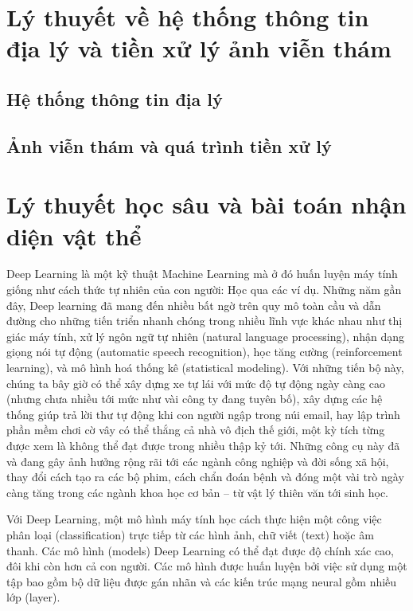 \documentclass[a4paper, 12pt]{report}
\begin{document}
\chapter{Lý thuyết về hệ thống thông tin địa lý và tiền xử lý ảnh viễn thám}

\section{Hệ thống thông tin địa lý}

\section{Ảnh viễn thám và quá trình tiền xử lý}




\chapter{Lý thuyết học sâu và bài toán nhận diện vật thể}
Deep Learning là một kỹ thuật Machine Learning mà ở đó huấn luyện máy tính giống như cách thức tự nhiên của con người: Học qua các ví dụ. Những năm gần đây, Deep learning đã mang đến nhiều bất ngờ trên quy mô toàn cầu và dẫn đường cho những tiến triển nhanh chóng trong nhiều lĩnh vực khác nhau như thị giác máy tính, xử lý ngôn ngữ tự nhiên (natural language processing), nhận dạng giọng nói tự động (automatic speech recognition), học tăng cường (reinforcement learning), và mô hình hoá thống kê (statistical modeling). Với những tiến bộ này, chúng ta bây giờ có thể xây dựng xe tự lái với mức độ tự động ngày càng cao (nhưng chưa nhiều tới mức như vài công ty đang tuyên bố), xây dựng các hệ thống giúp trả lời thư tự động khi con người ngập trong núi email, hay lập trình phần mềm chơi cờ vây có thể thắng cả nhà vô địch thế giới, một kỳ tích từng được xem là không thể đạt được trong nhiều thập kỷ tới. Những công cụ này đã và đang gây ảnh hưởng rộng rãi tới các ngành công nghiệp và đời sống xã hội, thay đổi cách tạo ra các bộ phim, cách chẩn đoán bệnh và đóng một vài trò ngày càng tăng trong các ngành khoa học cơ bản – từ vật lý thiên văn tới sinh học.\par
Với Deep Learning, một mô hình máy tính học cách thực hiện một công việc phân loại (classification) trực tiếp từ các hình ảnh, chữ viết (text) hoặc âm thanh. Các mô hình (models) Deep Learning có thể đạt được độ chính xác cao, đôi khi còn hơn cả con người. Các mô hình được huấn luyện bởi việc sử dụng một tập bao gồm bộ dữ liệu được gán nhãn và các kiến trúc mạng neural gồm nhiều lớp (layer). \par
\end{document}

